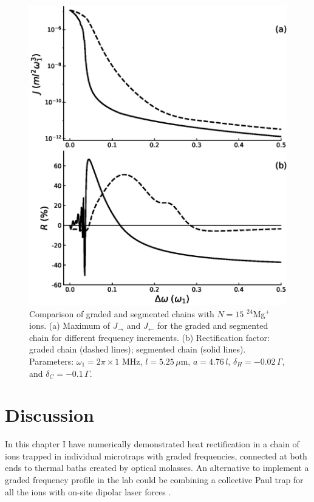 \begin{figure}
  \center
  \includegraphics[width=0.75\linewidth]{Figures/24Mg_Comparacion_Graded_AND_Segmented.eps}
  \caption{Comparison of graded and segmented chains with $N=15$ $^{24}$Mg$^+$ ions. (a) Maximum
  of $J_\rightarrow$ and $J_\leftarrow$
   for the graded and segmented chain for different frequency increments. (b) Rectification factor: graded chain (dashed lines); segmented chain (solid lines). Parameters: $\omega_1 = 2 \pi \times 1$ MHz, $l = 5.25\,\mu$m, $a = 4.76 \, l$, $\delta_H = -0.02 \, \Gamma$, and $\delta_C = -0.1 \, \Gamma$.}
  \label{fig:GS}
\end{figure}

\section{Discussion\label{sec:chapter5_Discussion}}
%
In this chapter I have numerically demonstrated heat rectification in a chain of ions trapped in individual microtraps with graded frequencies, connected at both ends to thermal baths
created by optical molasses. An alternative to implement a graded
frequency profile in the lab
could be combining a collective Paul trap for all the ions with on-site dipolar laser forces \cite{Freitas2015,Enderlein2012,Bermudez2013,Schneider2010}.

